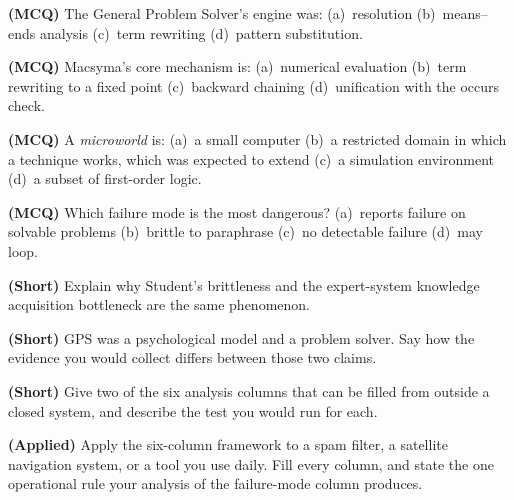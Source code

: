 \begin{reviewq}
  \item \textbf{(MCQ)} The General Problem Solver's engine was:
        (a)~resolution (b)~means--ends analysis (c)~term rewriting (d)~pattern
        substitution.
  \item \textbf{(MCQ)} Macsyma's core mechanism is: (a)~numerical evaluation
        (b)~term rewriting to a fixed point (c)~backward chaining (d)~unification
        with the occurs check.
  \item \textbf{(MCQ)} A \emph{microworld} is: (a)~a small computer
        (b)~a restricted domain in which a technique works, which was expected to
        extend (c)~a simulation environment (d)~a subset of first-order logic.
  \item \textbf{(MCQ)} Which failure mode is the most dangerous?
        (a)~reports failure on solvable problems (b)~brittle to paraphrase
        (c)~no detectable failure (d)~may loop.
  \item \textbf{(Short)} Explain why Student's brittleness and the expert-system
        knowledge acquisition bottleneck are the same phenomenon.
  \item \textbf{(Short)} GPS was a psychological model and a problem solver. Say how
        the evidence you would collect differs between those two claims.
  \item \textbf{(Short)} Give two of the six analysis columns that can be filled
        from outside a closed system, and describe the test you would run for each.
  \item \textbf{(Applied)} Apply the six-column framework to a spam filter, a
        satellite navigation system, or a tool you use daily. Fill every column,
        and state the one operational rule your analysis of the failure-mode column
        produces.
\end{reviewq}
